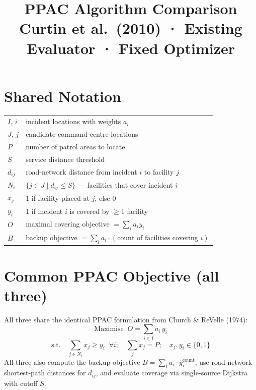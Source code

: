 \documentclass[11pt]{article}
\title{\textbf{PPAC Algorithm Comparison}\\[0.3em]
\large Curtin et al.\ (2010) · Existing Evaluator · Fixed Optimizer}
\date{}
\begin{document}
\maketitle

\section*{Shared Notation}

\begin{tabular}{@{}ll@{}}
$I,\,i$   & incident locations with weights $a_i$ \\
$J,\,j$   & candidate command-centre locations \\
$P$       & number of patrol areas to locate \\
$S$       & service distance threshold \\
$d_{ij}$  & road-network distance from incident $i$ to facility $j$ \\
$N_i$     & $\{j \in J \mid d_{ij} \le S\}$ — facilities that cover incident $i$ \\
$x_j$     & 1 if facility placed at $j$, else 0 \\
$y_i$     & 1 if incident $i$ is covered by $\ge 1$ facility \\
$O$       & maximal covering objective $= \sum_i a_i y_i$ \\
$B$       & backup objective $= \sum_i a_i \cdot (\text{count of facilities covering } i)$ \\
\end{tabular}

\section*{Common PPAC Objective (all three)}

{\color{common}
All three share the identical PPAC formulation from Church \& ReVelle (1974):
\[
  \text{Maximise}\;\; O = \sum_{i \in I} a_i\, y_i
\]
\[
  \text{s.t.}\quad \sum_{j \in N_i} x_j \ge y_i\;\;\forall i;\quad
  \sum_j x_j = P;\quad x_j,y_i \in \{0,1\}
\]
All three also compute the backup objective $B = \sum_i a_i \cdot y_i^{\text{count}}$,
use road-network shortest-path distances for $d_{ij}$,
and evaluate coverage via single-source Dijkstra with cutoff $S$.
}
\end{document}

